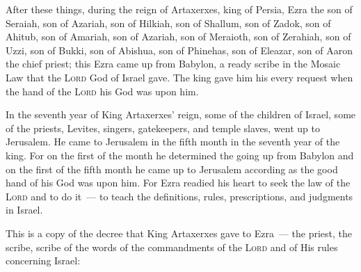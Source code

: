 
\begin{inparaenum}
   After these things, during the reign of Artaxerxes, king of Persia, Ezra the son of Seraiah, son of Azariah, son of Hilkiah,%
   son of Shallum, son of Zadok, son of Ahitub,%
   son of Amariah, son of Azariah, son of Meraioth,%
   son of Zerahiah, son of Uzzi, son of Bukki,%
   son of Abishua, son of Phinehas, son of Eleazar, son of Aaron the chief priest;%
   this Ezra came up from Babylon, a ready scribe in the Mosaic Law that the \textsc{Lord} God of Israel gave. The king gave him his every request when the hand of the \textsc{Lord} his God was upon him.%
  
   In the seventh year of King Artaxerxes' reign, some of the children of Israel, some of the priests, Levites, singers, gatekeepers, and temple slaves, went up to Jerusalem.%
   He came to Jerusalem in the fifth month in the seventh year of the king.%
   For on the first of the month he determined the going up from Babylon and on the first of the fifth month he came up to Jerusalem according as the good hand of his God was upon him.%
   For Ezra readied his heart to seek the law of the \textsc{Lord} and to do it~--- to teach the definitions, rules, prescriptions, and judgments in Israel.%
  
   This is a copy of the decree that King Artaxerxes gave to Ezra~--- the priest, the scribe, scribe of the words of the commandments of the \textsc{Lord} and of His rules concerning Israel:%
\end{inparaenum}
